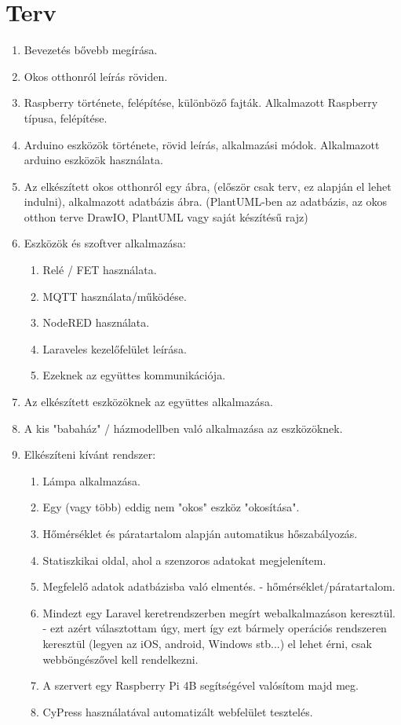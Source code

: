 \documentclass[
]{thesis-ekf}
\theoremstyle{definition}
\theoremstyle{remark}
\begin{document}
\chapter*{Terv}
\begin{enumerate}
	\item Bevezetés bővebb megírása.
	\item Okos otthonról leírás röviden.
	\item Raspberry története, felépítése, különböző fajták. Alkalmazott Raspberry típusa, felépítése.
	\item Arduino eszközök története, rövid leírás, alkalmazási módok. Alkalmazott arduino eszközök használata.
	\item Az elkészített okos otthonról egy ábra, (először csak terv, ez alapján el lehet indulni), alkalmazott adatbázis ábra. (PlantUML-ben az adatbázis, az okos otthon terve DrawIO, PlantUML vagy saját készítésű rajz)
	\item Eszközök és szoftver alkalmazása:
		\begin{enumerate}
			\item Relé / FET használata.
			\item MQTT használata/működése.
			\item NodeRED használata.
			\item Laraveles kezelőfelület leírása.
			\item Ezeknek az együttes kommunikációja.
		\end{enumerate}
	\item Az elkészített eszközöknek az együttes alkalmazása.
	\item A kis "babaház" / házmodellben való alkalmazása az eszközöknek.
	\item Elkészíteni kívánt rendszer:
	\begin{enumerate}
		\item Lámpa alkalmazása.
		\item Egy (vagy több) eddig nem "okos" eszköz "okosítása".
		\item Hőmérséklet és páratartalom alapján automatikus hőszabályozás.
		\item Statiszkikai oldal, ahol a szenzoros adatokat megjelenítem.
		\item Megfelelő adatok adatbázisba való elmentés. - hőmérséklet/páratartalom.
		\item Mindezt egy Laravel keretrendszerben megírt webalkalmazáson keresztül. - ezt azért választottam úgy, mert így ezt bármely operációs rendszeren keresztül (legyen az iOS, android, Windows stb...) el lehet érni, csak webböngészővel kell rendelkezni.
		\item A szervert egy Raspberry Pi 4B segítségével valósítom majd meg.
		\item CyPress használatával automatizált webfelület tesztelés.	
	\end{enumerate}
\end{enumerate}
\end{document}
